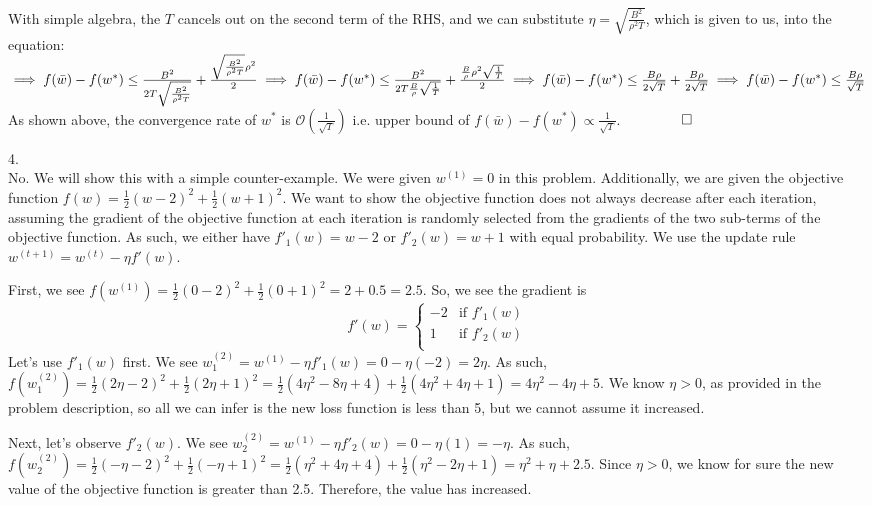 \documentclass[11pt,english]{article}
\begin{document}
	With simple algebra, the $T$ cancels out on the second term of the RHS, and we can substitute $\eta = \sqrt{\frac{B^2}{\rho^2 T}}$, which is given to us, into the equation:\\
	$\implies f(\bar{w}) - f(w^*) \leq \frac{B^2}{2T\sqrt{\frac{B^2}{\rho^2 T}}} + \frac{\sqrt{\frac{B^2}{\rho^2 T}}\rho^2}{2}\\
	\implies f(\bar{w}) - f(w^*) \leq \frac{B^2}{2T\frac{B}{\rho}\sqrt{\frac{1}{T}}} + \frac{\frac{B}{\rho}\rho^2\sqrt{\frac{1}{T}}}{2}\\
	\implies f(\bar{w}) - f(w^*) \leq \frac{B\rho}{2\sqrt{T}} + \frac{B\rho}{2\sqrt{T}}\\
	\implies f(\bar{w}) - f(w^*) \leq \frac{B\rho}{\sqrt{T}}$\\
	As shown above, the convergence rate of $w^*$ is $\mathcal{O}(\frac{1}{\sqrt{T}})$ i.e. upper bound of $f(\bar{w}) - f(w^*) \propto \frac{1}{\sqrt{T}}$. $\qquad \qed$
	\pagebreak
	
	4.\\
	No. We will show this with a simple counter-example. We were given $w^{(1)} = 0$ in this problem. Additionally, we are given the objective function $f(w) = \frac{1}{2}(w-2)^2 + \frac{1}{2}(w+1)^2$. We want to show the objective function does not always decrease after each iteration, assuming the gradient of the objective function at each iteration is randomly selected from the gradients of the two sub-terms of the objective function. As such, we either have $f'_1(w) = w-2$ or $f'_2(w) = w+1$ with equal probability. We use the update rule $w^{(t+1)} = w^{(t)} - \eta f'(w)$.
	
	First, we see $f(w^{(1)}) = \frac{1}{2}(0-2)^2 + \frac{1}{2}(0+1)^2 = 2 + 0.5 = 2.5$. So, we see the gradient is
	\[
	f'(w) =
	\begin{cases}
	-2 & \text{if $f'_1(w)$} \\
	1 & \text{if $f'_2(w)$} \\
	\end{cases}
	\]
	Let's use $f'_1(w)$ first. We see $w^{(2)}_1 = w^{(1)} - \eta f'_1(w) = 0 - \eta (-2) = 2\eta$. As such, $f(w^{(2)}_1) = \frac{1}{2}(2\eta-2)^2 + \frac{1}{2}(2\eta+1)^2 = \frac{1}{2}(4\eta^2-8\eta + 4) + \frac{1}{2}(4\eta^2 + 4\eta + 1) = 4\eta^2 - 4\eta + 5$. We know $\eta > 0$, as provided in the problem description, so all we can infer is the new loss function is less than 5, but we cannot assume it increased.
	
	Next, let's observe $f'_2(w)$. We see $w^{(2)}_2 = w^{(1)} - \eta f'_2(w) = 0 - \eta (1) = -\eta$. As such, $f(w^{(2)}_2) = \frac{1}{2}(-\eta-2)^2 + \frac{1}{2}(-\eta+1)^2 = \frac{1}{2}(\eta^2+4\eta+4) + \frac{1}{2}(\eta^2-2\eta+1) = \eta^2+\eta+2.5$. Since $\eta > 0$, we know for sure the new value of the objective function is greater than 2.5. Therefore, the value has increased. 
	
\end{document}
